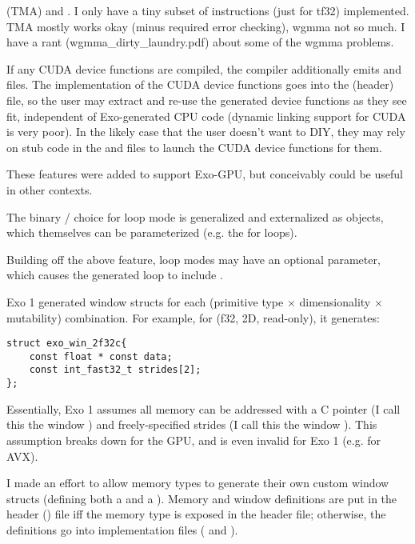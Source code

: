 \filbreak
{}  (TMA) and .
I only have a tiny subset of instructions (just for tf32) implemented.
TMA mostly works okay (minus required error checking), wgmma not so much.
I have a rant (wgmma\_dirty\_laundry.pdf) about some of the wgmma problems.

\filbreak
{} If any CUDA device functions are compiled, the compiler additionally emits  and  files.
The implementation of the CUDA device functions goes into the  (header) file, so the user may extract and re-use the generated device functions as they see fit, independent of Exo-generated CPU code
(dynamic linking support for CUDA is very poor).
In the likely case that the user doesn't want to DIY, they may rely on stub code in the  and  files to launch the CUDA device functions for them.

\filbreak
{}

These features were added to support Exo-GPU, but conceivably could be useful in other contexts.

\filbreak
{} The binary / choice for loop mode is generalized and externalized as  objects, which themselves can be parameterized (e.g. the  for  loops).

\filbreak
{} Building off the above feature,  loop modes may have an optional  parameter, which causes the generated loop to include .

\filbreak
{} Exo 1 generated window structs for each (primitive type $\times$ dimensionality $\times$ mutability) combination.
For example, for (f32, 2D, read-only), it generates:
{\color{lightttColor}
\begin{verbatim}
struct exo_win_2f32c{
    const float * const data;
    const int_fast32_t strides[2];
};
\end{verbatim}
}
\filbreak
Essentially, Exo 1 assumes all memory can be addressed with a C pointer (I call this the window ) and freely-specified strides (I call this the window ).
This assumption breaks down for the GPU, and is even invalid for Exo 1 (e.g. for AVX).

\filbreak
I made an effort to allow memory types to generate their own custom window structs (defining both a  and a ).
Memory and window definitions are put in the header () file iff the memory type is exposed in the header file; otherwise, the definitions go into implementation files ( and ).

